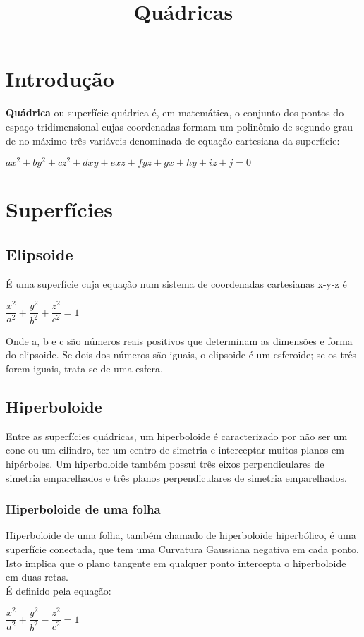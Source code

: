 \documentclass[12 pt, a4 paper]{article}
\title{Quádricas}
\date{}
\begin{document}
\maketitle

\section{Introdução}

\textbf{Quádrica} ou superfície quádrica é, em matemática, o conjunto dos pontos do espaço tridimensional cujas coordenadas formam um polinômio de segundo grau de no máximo três variáveis denominada de equação cartesiana da superfície: 
\begin{center}
$ax^2+by^2+cz^2+dxy+exz+fyz+gx+hy+iz+j=0$
\end{center}


\section{Superfícies}
\subsection{Elipsoide}
É uma superfície cuja equação num sistema de coordenadas cartesianas x-y-z é
\begin{center}
$\dfrac{x^2}{a^2} + \dfrac{y^2}{b^2} + \dfrac{z^2}{c^2} = 1$
\end{center}

Onde a, b e c são números reais positivos que determinam as dimensões e forma do elipsoide. Se dois dos números são iguais, o elipsoide é um esferoide; se os três forem iguais, trata-se de uma esfera.

\subsection{Hiperboloide}
 Entre as superfícies quádricas, um hiperboloide é caracterizado por não ser um cone ou um cilindro, ter um centro de simetria e interceptar muitos planos em hipérboles. Um hiperboloide também possui três eixos perpendiculares de simetria emparelhados e três planos perpendiculares de simetria emparelhados.
 
\subsubsection{Hiperboloide de uma folha}
Hiperboloide de uma folha, também chamado de hiperboloide hiperbólico, é uma superfície conectada, que tem uma Curvatura Gaussiana negativa em cada ponto. Isto implica que o plano tangente em qualquer ponto intercepta o hiperboloide em duas retas.
\\
É definido pela equação:
\begin{center}
$\dfrac{x^2}{a^2} + \dfrac{y^2}{b^2} - \dfrac{z^2}{c^2} = 1$
\end{center}
\end{document}
